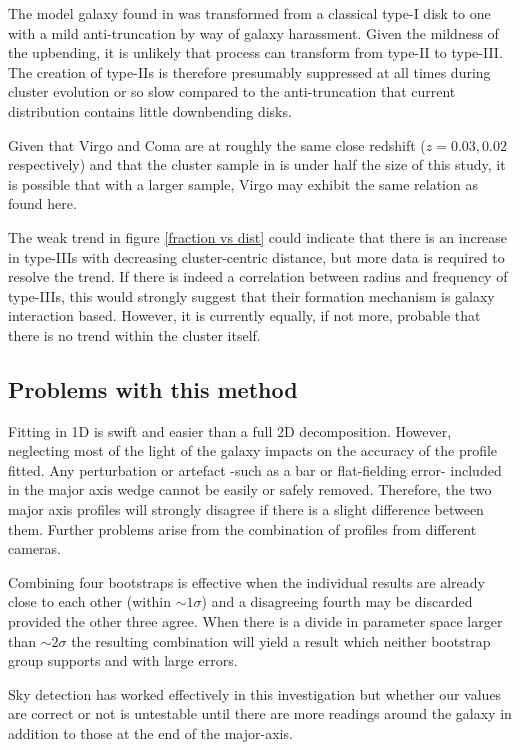 The model galaxy found in \citet{moore_survival_1999,moore_galaxy_1996} was transformed from a classical type-I disk to one with a mild anti-truncation by way of galaxy harassment. Given the mildness of the upbending, it is unlikely that process can transform from type-II to type-III. The creation of type-IIs is therefore presumably suppressed at all times during cluster evolution or so slow compared to the anti-truncation that current distribution contains little downbending disks.

Given that Virgo and Coma are at roughly the same close redshift ($z=0.03, 0.02$ respectively) \citep{bower_precision_1992} and that the cluster sample in \citet{erwin_strong_2012} is under half the size of this study, it is possible that with a larger sample, Virgo may exhibit the same relation as found here.

The weak trend in figure \ref{fraction vs dist} could indicate that there is an increase in type-IIIs with decreasing cluster-centric distance, but more data is required to resolve the trend. If there is indeed a correlation between radius and frequency of type-IIIs, this would strongly suggest that their formation mechanism is galaxy interaction based. However, it is currently equally, if not more, probable that there is no trend within the cluster itself. 

\subsection{Problems with this method}
Fitting in 1D is swift and easier than a full 2D decomposition. However, neglecting most of the light of the galaxy impacts on the accuracy of the profile fitted. Any perturbation or artefact -such as a bar or flat-fielding error- included in the major axis wedge cannot be easily or safely removed. Therefore, the two major axis profiles will strongly disagree if there is a slight difference between them. Further problems arise from the combination of profiles from different cameras. 

Combining four bootstraps is effective when the individual results are already close to each other (within $\sim 1\sigma$) and a disagreeing fourth may be discarded provided the other three agree. When there is a divide in parameter space larger than $\sim 2\sigma$ the resulting combination will yield a result which neither bootstrap group supports and with large errors. 

Sky detection has worked effectively in this investigation but whether our values are correct or not is untestable until there are more readings around the galaxy in addition to those at the end of the major-axis. 